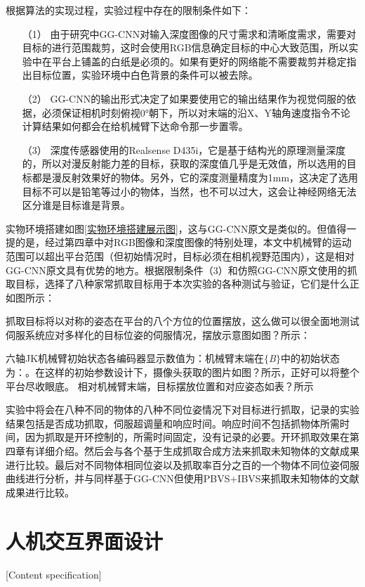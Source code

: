 \documentclass[fontset=fandol,type=bachelor,campus=harbin]{hithesisbook}
\begin{document}
根据算法的实现过程，实验过程中存在的限制条件如下：
\begin{itemize}
\item[（1）]
由于研究中GG-CNN对输入深度图像的尺寸需求和清晰度需求，需要对目标的进行范围裁剪，这时会使用RGB信息确定目标的中心大致范围，所以实验中在平台上铺盖的白纸是必须的。如果有更好的网络能不需要裁剪并稳定指出目标位置，实验环境中白色背景的条件可以被去除。
\item[（2）]
GG-CNN的输出形式决定了如果要使用它的输出结果作为视觉伺服的依据，必须保证相机时刻俯视0°朝下，所以对末端的沿X、Y轴角速度指令不论计算结果如何都会在给机械臂下达命令那一步置零。
\item[（3）]
深度传感器使用的Realsense D435i，它是基于结构光的原理测量深度的，所以对漫反射能力差的目标，获取的深度值几乎是无效值，所以选用的目标都是漫反射效果好的物体。另外，它的深度测量精度为1mm，这决定了选用目标不可以是铅笔等过小的物体，当然，也不可以过大，这会让神经网络无法区分谁是目标谁是背景。
\end{itemize}


实物环境搭建如图\ref{实物环境搭建展示图}，这与GG-CNN原文是类似的。但值得一提的是，经过第四章中对RGB图像和深度图像的特别处理，本文中机械臂的运动范围可以超出平台范围（但初始情况时，目标必须在相机视野范围内），这是相对GG-CNN原文具有优势的地方。根据限制条件（3）和仿照GG-CNN原文使用的抓取目标，选择了八种家常抓取目标用于本次实验的各种测试与验证，它们是什么{\color{red}正如图所示}：


抓取目标将以对称的姿态在平台的八个方位的位置摆放，这么做可以很全面地测试伺服系统应对多样化的目标位姿的伺服情况，摆放示意图{\color{red}如图？所示}：


{\color{red}六轴JK机械臂初始状态各编码器显示数值为：机械臂末端在$\lbrace$\textit{B}$\rbrace$中的初始状态为：。在这样的初始参数设计下，摄像头获取的图片如图？所示，正好可以将整个平台尽收眼底。
相对机械臂末端，目标摆放位置和对应姿态如表？所示}


实验中将会在八种不同的物体的八种不同位姿情况下对目标进行抓取，记录的实验结果包括是否成功抓取，伺服超调量和响应时间。响应时间不包括抓物体所需时间，因为抓取是开环控制的，所需时间固定，没有记录的必要。开环抓取效果在第四章有详细介绍。然后会与各个基于生成抓取合成方法来抓取未知物体的文献成果进行比较。最后对不同物体相同位姿以及抓取率百分之百的一个物体不同位姿伺服曲线进行分析，并与同样基于GG-CNN但使用PBVS+IBVS来抓取未知物体的文献成果\cite{haviland2020control}进行比较。
\section{人机交互界面设计}[Content specification]
\end{document}
